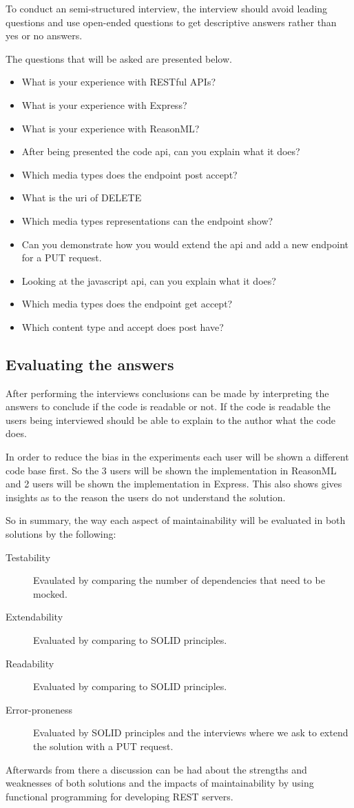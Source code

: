 To conduct an semi-structured interview, the interview should avoid leading
questions and use open-ended questions to get descriptive answers rather than
yes or no answers. 

The questions that will be asked are presented below.

\begin{itemize}
    \item What is your experience with RESTful APIs?
    \item What is your experience with Express?
    \item What is your experience with ReasonML?
    \item After being presented the code api, can you explain what it does?
    \item Which media types does the endpoint post accept?
    \item What is the uri of DELETE
    \item Which media types representations can the endpoint show?
    \item Can you demonstrate how you would extend the api and add a new endpoint
    for a PUT request.
    \item Looking at the javascript api, can you explain what it does?
    \item Which media types does the endpoint get accept?
    \item Which content type and accept does post have?
\end{itemize}

\subsection{Evaluating the answers}

After performing the interviews conclusions can be made by interpreting the
answers to conclude if the code is readable or not. If the code is readable the
users being interviewed should be able to explain to the author what the code
does.

In order to reduce the bias in the experiments each user will be shown a
different code base first. So the 3 users will be shown the implementation in
ReasonML and 2 users will be shown the implementation in Express. This also
shows gives insights as to the reason the users do not understand the solution.

So in summary, the way each aspect of maintainability will be evaluated in both
solutions by the following:

\begin{description}
    \item [Testability] Evaulated by comparing the number of dependencies that
    need to be mocked. 
    \item [Extendability] Evaluated by comparing to SOLID principles.
    \item [Readability] Evaluated by comparing to SOLID principles.
    \item [Error-proneness] Evaluated by SOLID principles and the interviews
        where we ask to extend the solution with a PUT request.
\end{description}

Afterwards from there a discussion can be had about the strengths and weaknesses
of both solutions and the impacts of maintainability by using functional
programming for developing REST servers.





